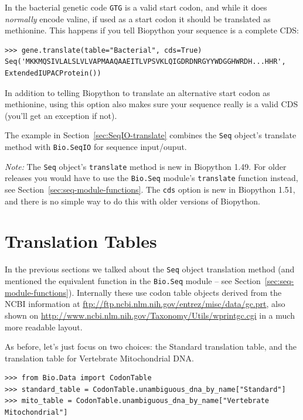 \documentclass{report}
\begin{document}
\noindent In the bacterial genetic code \texttt{GTG} is a valid start codon,
and while it does \emph{normally} encode valine, if used as a start codon it
should be translated as methionine. This happens if you tell Biopython your
sequence is a complete CDS:

\begin{verbatim}
>>> gene.translate(table="Bacterial", cds=True)
Seq('MKKMQSIVLALSLVLVAPMAAQAAEITLVPSVKLQIGDRDNRGYYWDGGHWRDH...HHR',
ExtendedIUPACProtein())
\end{verbatim}

In addition to telling Biopython to translate an alternative start codon as
methionine, using this option also makes sure your sequence really is a valid
CDS (you'll get an exception if not).

The example in Section~\ref{sec:SeqIO-translate} combines the \verb|Seq| object's
translate method with \verb|Bio.SeqIO| for sequence input/ouput.

\emph{Note:} The \verb|Seq| object's \verb|translate| method is new in Biopython 1.49.
For older releases you would have to use the \verb|Bio.Seq| module's \verb|translate|
function instead, see Section~\ref{sec:seq-module-functions}. The \texttt{cds} option
is new in Biopython 1.51, and there is no simple way to do this with older versions
of Biopython.

\section{Translation Tables}

In the previous sections we talked about the \verb|Seq| object translation method (and mentioned the equivalent function in the \verb|Bio.Seq| module -- see
Section~\ref{sec:seq-module-functions}).
Internally these use codon table objects derived from the NCBI information at
\url{ftp://ftp.ncbi.nlm.nih.gov/entrez/misc/data/gc.prt}, also shown on
\url{http://www.ncbi.nlm.nih.gov/Taxonomy/Utils/wprintgc.cgi} in a much more readable layout.

As before, let's just focus on two choices: the Standard translation table, and the
translation table for Vertebrate Mitochondrial DNA. 

\begin{verbatim}
>>> from Bio.Data import CodonTable
>>> standard_table = CodonTable.unambiguous_dna_by_name["Standard"]
>>> mito_table = CodonTable.unambiguous_dna_by_name["Vertebrate Mitochondrial"]
\end{verbatim}
\end{document}
